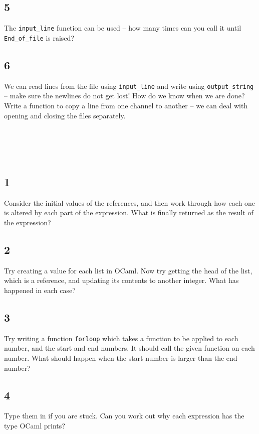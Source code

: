 \documentclass[]{book}
\begin{document}
\begin{multicols*}{2}
\subsection*{5}
The \texttt{input\_line} function can be used -- how many times can you call it until \texttt{End\_of\_file} is raised?

\subsection*{6}
We can read lines from the file using \texttt{input\_line} and write using \texttt{output\_string} -- make sure the newlines do not get lost! How do we know when we are done? Write a function to copy a line from one channel to another -- we can deal with opening and closing the files separately.

\section*{\\ }
\subsection*{1}
Consider the initial values of the references, and then work through how each one is altered by each part of the expression. What is finally returned as the result of the expression?

\subsection*{2}
Try creating a value for each list in OCaml. Now try getting the head of the list, which is a reference, and updating its contents to another integer. What has happened in each case?

\subsection*{3}
Try writing a function \texttt{forloop} which takes a function to be applied to each number, and the start and end numbers. It should call the given function on each number. What should happen when the start number is larger than the end number?

\subsection*{4}
Type them in if you are stuck. Can you work out why each expression has the type OCaml prints?


\end{multicols*}
\end{document}
